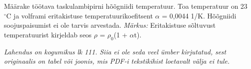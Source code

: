 
Määrake töötava taskulambipirni hõõgniidi temperatuur. Toa temperatuur on 23 $^\circ$C ja volframi eritakistuse temperatuurikoefitsent $\alpha$ = 0,0044 1/K. Hõõgniidi soojuspaisumist ei ole tarvis arvestada.
\textit{Märkus:} Eritakistuse sõltuvust temperatuurist kirjeldab seos $\rho$ = $\rho_0$(1 + $\alpha$t).

\hint

\solu
\textit{Lahendus on kogumikus lk 111. Siia ei ole seda veel ümber kirjutatud, sest originaalis on tabel või joonis, mis PDF-i tekstikihist loetavalt välja ei tule.}
\probend
